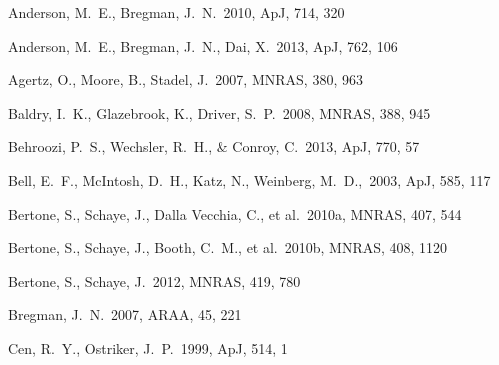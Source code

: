 \documentclass[useAMS,usenatbib]{mn2e}
\def \apj {ApJ}
\def \mnras {MNRAS}
\begin{document}

\begin{thebibliography}{}


 Anderson, M.~E., Bregman, J.~N.\ 2010, \apj, 714, 320

 Anderson, M.~E., Bregman, J.~N., Dai, X.\ 2013, \apj, 762, 106

 Agertz, O., Moore, B., Stadel, J.\ 2007, \mnras, 380, 963


 Baldry, I.~K., Glazebrook, K., Driver, S.~P.\ 2008, \mnras, 388, 945

 Behroozi, P.~S.,
  Wechsler, R.~H., \& Conroy, C.\ 2013, \apj, 770, 57

 Bell, E.~F., McIntosh, D.~H., Katz, N., Weinberg, M.~D.,\ 2003, \apj, 585, 117

%
 Bertone, S., Schaye, J., Dalla Vecchia, C., et al.\ 2010a, \mnras, 407, 544

%
 Bertone, S., Schaye, J., Booth, C.~M., et al.\ 2010b, \mnras, 408, 1120

%
 Bertone, S., Schaye, J.\ 2012, \mnras, 419, 780

Bregman, J.~N.\ 2007, ARAA, 45, 221


Cen, R.~Y., Ostriker, J.~P.\ 1999, \apj, 514, 1




\end{thebibliography}
\end{document}
